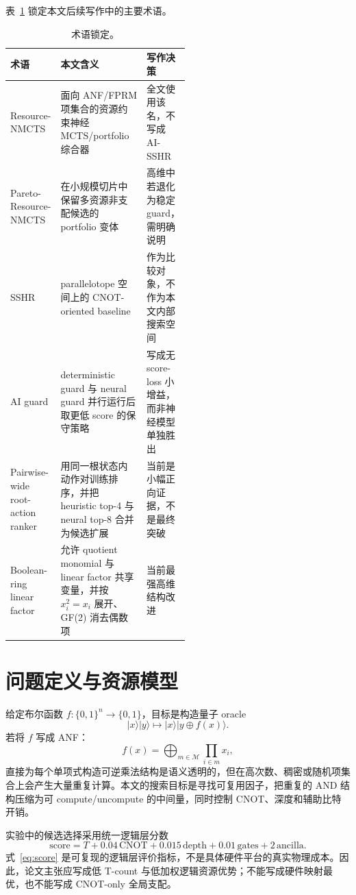 \documentclass[UTF8,fontset=macnew,11pt]{ctexart}
\newcommand{\method}{Resource-NMCTS}
\newcommand{\pareto}{Pareto-Resource-NMCTS}
\newcommand{\score}{\ensuremath{\mathrm{score}}}
\begin{document}
表~\ref{tab:terminology} 锁定本文后续写作中的主要术语。

\begin{table}[t]
\centering
\small
\caption{术语锁定。}
\label{tab:terminology}
\begin{tabularx}{\linewidth}{>{\raggedright\arraybackslash}p{0.28\linewidth}
  >{\raggedright\arraybackslash}X
  >{\raggedright\arraybackslash}p{0.24\linewidth}}
\toprule
术语 & 本文含义 & 写作决策 \\
\midrule
\method{} & 面向 ANF/FPRM 项集合的资源约束神经 MCTS/portfolio 综合器 & 全文使用该名，不写成 AI-SSHR \\
\pareto{} & 在小规模切片中保留多资源非支配候选的 portfolio 变体 & 高维中若退化为稳定 guard，需明确说明 \\
SSHR & parallelotope 空间上的 CNOT-oriented baseline & 作为比较对象，不作为本文内部搜索空间 \\
AI guard & deterministic guard 与 neural guard 并行运行后取更低 score 的保守策略 & 写成无 score-loss 小增益，而非神经模型单独胜出 \\
Pairwise-wide root-action ranker & 用同一根状态内动作对训练排序，并把 heuristic top-4 与 neural top-8 合并为候选扩展 & 当前是小幅正向证据，不是最终突破 \\
Boolean-ring linear factor & 允许 quotient monomial 与 linear factor 共享变量，并按 $x_i^2=x_i$ 展开、GF(2) 消去偶数项 & 当前最强高维结构改进 \\
\bottomrule
\end{tabularx}
\end{table}

\section{问题定义与资源模型}

给定布尔函数 $f:\{0,1\}^{n}\rightarrow\{0,1\}$，目标是构造量子 oracle
\[
  |x\rangle|y\rangle \mapsto |x\rangle|y\oplus f(x)\rangle .
\]
若将 $f$ 写成 ANF：
\[
  f(x)=\bigoplus_{m\in\mathcal{M}}\prod_{i\in m}x_i ,
\]
直接为每个单项式构造可逆乘法结构是语义透明的，但在高次数、稠密或随机项集合上会产生大量重复计算。本文的搜索目标是寻找可复用因子，把重复的 AND 结构压缩为可 compute/uncompute 的中间量，同时控制 CNOT、深度和辅助比特开销。

实验中的候选选择采用统一逻辑层分数
\begin{equation}
  \score = T + 0.04\,\mathrm{CNOT} + 0.015\,\mathrm{depth}
         + 0.01\,\mathrm{gates} + 2\,\mathrm{ancilla}.
  \label{eq:score}
\end{equation}
式~\eqref{eq:score} 是可复现的逻辑层评价指标，不是具体硬件平台的真实物理成本。因此，论文主张应写成低 T-count 与低加权逻辑资源优势；不能写成硬件映射最优，也不能写成 CNOT-only 全局支配。
\end{document}
